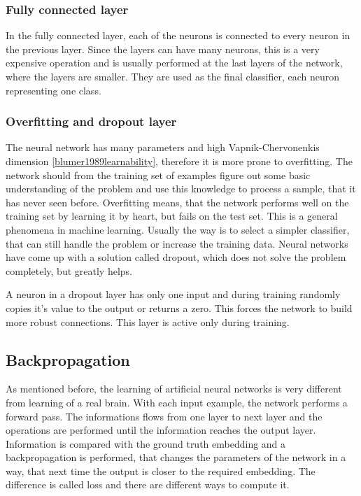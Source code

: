 \documentclass[a4paper,12pt,titlepage]{article}
\numberwithin{figure}{section}
\begin{document}
\subsubsection{Fully connected layer}
In the fully connected layer, each of the neurons is connected to every neuron in the previous layer. Since the layers can have many neurons, this is a very expensive operation and is usually performed at the last layers of the network, where the layers are smaller. They are used as the final classifier, each neuron representing one class.

\subsubsection{Overfitting and dropout layer}
The neural network has many parameters and high Vapnik-Chervonenkis dimension \ref{blumer1989learnability}, therefore it is more prone to overfitting. The network should from the training set of examples figure out some basic understanding of the problem and use this knowledge to process a sample, that it has never seen before. Overfitting means, that the network performs well on the training set by learning it by heart, but fails on the test set. This is a general phenomena in machine learning. Usually the way is to select a simpler classifier, that can still handle the problem or increase the training data. Neural networks have come up with a solution called dropout, which does not solve the problem completely, but greatly helps. 

A neuron in a dropout layer has only one input and during training randomly copies it's value to the output or returns a zero. This forces the network to build more robust connections. This layer is active only during training. 


\subsection{Backpropagation}
\label{sec:back-prop}
As mentioned before, the learning of artificial neural networks is very different from learning of a real brain. With each input example, the network performs a forward pass. The informations flows from one layer to next layer and the operations are performed until the information reaches the output layer. Information is compared with the ground truth embedding and a backpropagation is performed, that changes the parameters of the network in a way, that next time the output is closer to the required embedding. The difference is called loss and there are different ways to compute it.
\end{document}
